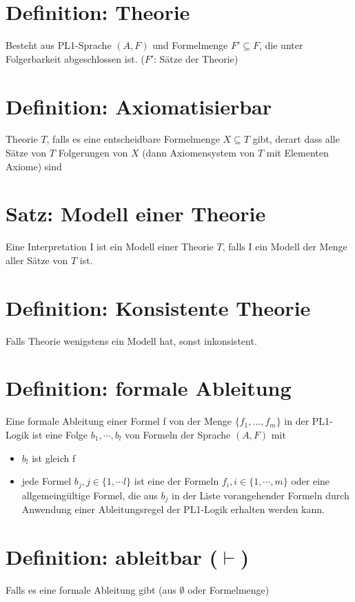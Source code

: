 \documentclass[12pt, a4paper]{article}
\begin{document}
\section*{Definition: Theorie}
Besteht aus PL1-Sprache $(A, F)$ und Formelmenge $F' \subseteq F$, die unter Folgerbarkeit abgeschlossen ist. ($F'$: Sätze der Theorie)

\section*{Definition: Axiomatisierbar}
Theorie $T$, falls es eine entscheidbare Formelmenge $X \subseteq T$ gibt, derart dass alle Sätze von $T$ Folgerungen von $X$ (dann Axiomensystem von $T$ mit Elementen Axiome) sind

\section*{Satz: Modell einer Theorie}
Eine Interpretation I ist ein Modell einer Theorie $T$, falls I ein Modell der Menge aller Sätze von $T$  ist.

\section*{Definition: Konsistente Theorie}
Falls Theorie wenigstens ein Modell hat, sonst inkonsistent.

\section*{Definition: formale Ableitung}
Eine formale Ableitung einer Formel f von der Menge $\{f_1,..., f_m \}$ in der PL1- Logik ist eine Folge $b_1, \cdots, b_l$ von Formeln der Sprache $(A, F)$ mit 
\begin{itemize}
\item $b_l$ ist gleich f 
\item jede Formel $b_j, j \in \{ 1, \cdots l \}$ ist eine der Formeln $f_i, i \in \{ 1, \cdots, m \}$ oder eine allgemeingültige Formel, die aus $b_j$ in der Liste  vorangehender Formeln durch Anwendung einer Ableitungsregel der PL1-Logik erhalten werden kann.
\end{itemize}

\section*{Definition: ableitbar ($\vdash$)}
Falls es eine formale Ableitung gibt (aus $\emptyset$ oder Formelmenge)
\end{document}
